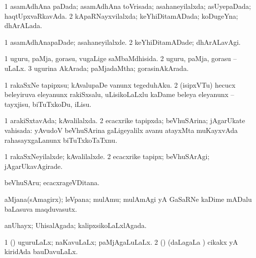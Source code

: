 \bentry
{} 
\gl{\gu}
\expl{}
\bmng
\bnum
\num{1} asamAdhAna paDada; asamAdhAna toVrisada; asahaneyilalxda; asUyepaDada; haqtUpxvaRkavAda. 
\num{2} kApaRNayxvilalxda; keYhiDitamADada; koDugeYna; dhArALada. 
\enum
\emng
\eentry

\bentry
{} 
\gl{\kirxvi}
\expl{}
\bmng
\bnum
\num{1} asamAdhAnapaDade; asahaneyilalxde. 
\num{2} keYhiDitamADade; dhArALavAgi. 
\enum
\emng
\eentry

\bentry
{} 
\gl{\gu}
\bmng
\bnum
\num{1} uguru, paMja, gorasu, \mo vugaLige saMbaMdhisida. 
\num{2} uguru, paMja, gorasu -- uLaLx. 
\num{3} ugurina AkArada; paMjadaMtha; gorasinAkArada. 
\enum
\emng
\eentry

\bentry
{} 
\gl{\sakirx}
\expl{}
\bmng
\bnum
\num{1} rakaSxNe tapipxsu; kAvalupaDe \mo vanunx tegeduhAku. 
\num{2} (isipxVTu) hecucx beleyiruva eleyanunx rakiSxsalu, uLisikoLaLxlu kaDame beleya eleyanunx -- tayxjisu, biTuTxkoDu, iLisu. 
\enum
\emng
\eentry

\bentry
{} 
\gl{\gu}
\expl{}
\bmng
\bnum
\num{1} arakiSxtavAda; kAvalilalxda. 
\num{2} ecacxrike tapipxda; beVhuSArina; jAgarUkate vahisada:  yAvudoV beVhuSArina gaLigeyalilx avanu atayxMta muKayxvAda rahasayxgaLanunx biTuTxkoTaTxnu. 
\enum
\emng
\eentry

\bentry
{} 
\gl{\kirxvi}
\expl{}
\bmng
\bnum
\num{1} rakaSxNeyilalxde; kAvalilalxde. 
\num{2} ecacxrike tapipx; beVhuSArAgi; jAgarUkavAgirade. 
\enum
\emng
\eentry

\bentry
{} 
\gl{\nA}
\expl{}
\bmng
 beVhuSAru; ecacxrageVDitana. 
\emng
\eentry

\bentry
{} 
\gl{\nA}
\expl{}
\bmng
 aMjana(sAmagirx); leVpana; mulAmu; mulAmAgi yA GaSaRNe kaDime mADalu baLasuva maqduvasutx. 
\emng
\eentry

\bentry
{} 
\gl{\gu}
\expl{}
\bmng
 anUhayx; UhisalAgada; kalipxsikoLaLxlAgada. 
\emng
\eentry



\bentry
{} 
\gl{\gu}
\expl{}
\bmng
\bnum
\num{1} (\pArxparx) uguruLaLx; naKavuLaLx; paMjAgaLuLaLx. 
\num{2} (\savi) (daLagaLa \vi) cikakx yA kiridAda bauDavuLaLx. 
\enum
\emng
\eentry

